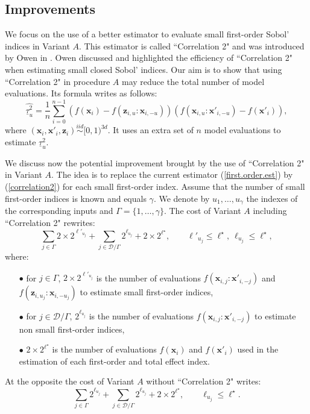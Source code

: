 \documentclass[]{elsarticle}
\theoremstyle{definition}
\newcommand{\bvec}[1]{\boldsymbol{#1}}
\newcommand{\vx}{\bvec{x}}
\newcommand{\vz}{\bvec{z}}
\newcommand\iid{\stackrel{iid}{\sim}}
\begin{document}
\subsection{Improvements}

We focus on the use of a better estimator to evaluate small first-order Sobol' indices in Variant $A$. This estimator is called ``Correlation 2" and was introduced by Owen in \cite{Owen}. Owen discussed and highlighted the efficiency of ``Correlation 2" when estimating small closed Sobol' indices. Our aim is to show that using ``Correlation 2" in procedure $A$ may reduce the total number of model evaluations. Its formula writes as follows:
\begin{equation}
\widehat{\underline{\tau}_u^2} = \frac{1}{n} \sum \limits_{i=0}^{n-1} (f(\vx_i)-f({\vz}_{i,u}:{\vx}_{i,-u}))(f(\vx_{i,u}:{\vx'}_{i,-u})-f({\vx'}_i)),
\label{correlation2}
\end{equation}
where $(\vx_i,{\vx'}_i, \vz_i) \iid [0,1)^{3d}$. It uses an extra set of $n$ model evaluations to estimate $\underline{\tau}_u^2$.
\bigskip

We discuss now the potential improvement brought by the use of ``Correlation 2" in Variant $A$. The idea is to replace the current estimator (\ref{first.order.est}) by (\ref{correlation2}) for each small first-order index. Assume that the number of small first-order indices is known and equals $\gamma$. We denote by $u_1,\dots,u_{\gamma}$ the indexes of the corresponding inputs and $\Gamma = \{1,\dots,\gamma\}$. The cost of Variant $A$ including ``Correlation 2" rewrites: 
\begin{equation}
\sum \limits_{j \in \Gamma} 2 \times 2^{\ell'_{u_j}} + \sum \limits_{j \in \mathcal{D}/\Gamma} 2^{\ell_{u_j}} + 2 \times 2^{\ell^\star}, \qquad \ell'_{u_j}\leq \ell^{\star}, \ \ell_{u_j} \leq \ell^{\star},
\label{cost.improvement}
\end{equation}
where: \begin{itemize}
\item[$\bullet$] for $j\in \Gamma$, $2 \times 2^{\ell'_{u_j}}$ is the number of evaluations $f\left(\vx_{i,j}:{\vx'}_{i,-j}\right)$ and $f\left(\vz_{i,u_j}:\vx_{i,-u_j}\right)$ to estimate small first-order indices,
\item[$\bullet$] for $j\in \mathcal{D}/\Gamma$, $ 2^{\ell_{u_j}}$ is the number of evaluations $f\left(\vx_{i,j}:{\vx'}_{i,-j}\right)$ to estimate non small first-order indices,
\item[$\bullet$] $2 \times 2^{\ell^{\star}}$ is the number of evaluations $f\left(\vx_{i}\right)$ and $f\left({\vx'}_{i}\right)$ used in the estimation of each first-order and total effect index.
\end{itemize}
At the opposite the cost of Variant $A$ without  ``Correlation 2" writes:
\begin{equation}
\sum \limits_{j \in \Gamma} 2^{\ell_{u_j}} + \sum \limits_{j \in \mathcal{D}/\Gamma} 2^{\ell_{u_j}} + 2 \times 2^{\ell^{\star}}, \qquad \ell_{u_j} \leq \ell^{\star}.
\label{cost.non.improvement}
\end{equation}
\end{document}
